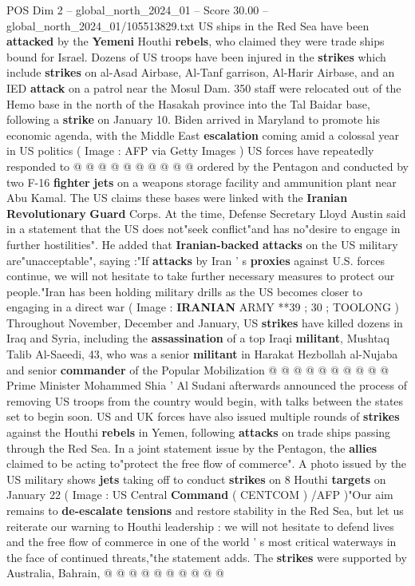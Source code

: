 \begin{textsample}{POS Dim 2 – global\_north\_2024\_01 – Score 30.00 – global\_north\_2024\_01/105513829.txt}
US ships in the Red Sea have been \textbf{attacked} by the \textbf{Yemeni} Houthi \textbf{rebels}, who claimed they were trade ships bound for Israel.
Dozens of US troops have been injured in the \textbf{strikes} which include \textbf{strikes} on al-Asad Airbase, Al-Tanf garrison, Al-Harir Airbase, and an IED \textbf{attack} on a patrol near the Mosul Dam. 350 staff were relocated out of the Hemo base in the north of the Hasakah province into the Tal Baidar base, following a \textbf{strike} on January 10.
Biden arrived in Maryland to promote his economic agenda, with the Middle East \textbf{escalation} coming amid a colossal year in US politics ( Image : AFP via Getty Images ) US forces have repeatedly responded to @ @ @ @ @ @ @ @ @ @ ordered by the Pentagon and conducted by two F-16 \textbf{fighter} \textbf{jets} on a weapons storage facility and ammunition plant near Abu Kamal.
The US claims these bases were linked with the \textbf{Iranian} \textbf{Revolutionary} \textbf{Guard} Corps.
At the time, Defense Secretary Lloyd Austin said in a statement that the US does not"seek conflict"and has no"desire to engage in further hostilities".
He added that \textbf{Iranian-backed} \textbf{attacks} on the US military are"unacceptable", saying :"If \textbf{attacks} by Iran ' s \textbf{proxies} against U.S. forces continue, we will not hesitate to take further necessary measures to protect our people."Iran has been holding military drills as the US becomes closer to engaging in a direct war ( Image : \textbf{IRANIAN} ARMY **39 ; 30 ; TOOLONG ) Throughout November, December and January, US \textbf{strikes} have killed dozens in Iraq and Syria, including the \textbf{assassination} of a top Iraqi \textbf{militant}, Mushtaq Talib Al-Saeedi, 43, who was a senior \textbf{militant} in Harakat Hezbollah al-Nujaba and senior \textbf{commander} of the Popular Mobilization @ @ @ @ @ @ @ @ @ @ Prime Minister Mohammed Shia ' Al Sudani afterwards announced the process of removing US troops from the country would begin, with talks between the states set to begin soon.
US and UK forces have also issued multiple rounds of \textbf{strikes} against the Houthi \textbf{rebels} in Yemen, following \textbf{attacks} on trade ships passing through the Red Sea.
In a joint statement issue by the Pentagon, the \textbf{allies} claimed to be acting to"protect the free flow of commerce".
A photo issued by the US military shows \textbf{jets} taking off to conduct \textbf{strikes} on 8 Houthi \textbf{targets} on January 22 ( Image : US Central \textbf{Command} ( CENTCOM ) /AFP )"Our aim remains to \textbf{de-escalate} \textbf{tensions} and restore stability in the Red Sea, but let us reiterate our warning to Houthi leadership : we will not hesitate to defend lives and the free flow of commerce in one of the world ' s most critical waterways in the face of continued threats,"the statement adds.
The \textbf{strikes} were supported by Australia, Bahrain, @ @ @ @ @ @ @ @ @ @


\end{textsample}
